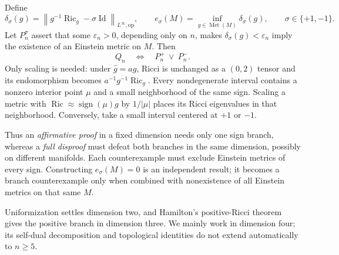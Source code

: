 \documentclass[a4paper,11pt]{article}
\numberwithin{equation}{section}
\theoremstyle{definition}
\newcommand{\Ric}{\operatorname{Ric}}
\newcommand{\Met}{\operatorname{Met}}
\newcommand{\Id}{\operatorname{Id}}
\newcommand{\op}{\mathrm{op}}
\newcommand{\norm}[1]{\left\lVert#1\right\rVert}
\begin{document}
Define
\begin{equation}\label{eq:defect}
 \delta_\sigma(g)=\norm{g^{-1}\Ric_g-\sigma\Id}_{L^\infty,\op},\qquad
 e_\sigma(M)=\inf_{g\in\Met(M)}\delta_\sigma(g),\qquad \sigma\in\{+1,-1\}.
\end{equation}
Let $P_n^\sigma$ assert that some $\varepsilon_n>0$, depending only on $n$, makes $\delta_\sigma(g)<\varepsilon_n$ imply the existence of an Einstein metric on $M$. Then
\begin{equation}\label{eq:branches}
 Q_n\quad\Longleftrightarrow\quad P_n^+\ \lor\ P_n^-.
\end{equation}
Only scaling is needed: under $\widehat g=ag$, Ricci is unchanged as a $(0,2)$ tensor and its endomorphism becomes $a^{-1}g^{-1}\Ric_g$. Every nondegenerate interval contains a nonzero interior point $\mu$ and a small neighborhood of the same sign. Scaling a metric with $\Ric\approx\operatorname{sign}(\mu)g$ by $1/|\mu|$ places its Ricci eigenvalues in that neighborhood. Conversely, take a small interval centered at $+1$ or $-1$.

Thus an \emph{affirmative proof} in a fixed dimension needs only one sign branch, whereas a \emph{full disproof} must defeat both branches in the same dimension, possibly on different manifolds. Each counterexample must exclude Einstein metrics of every sign. Constructing $e_\sigma(M)=0$ is an independent result; it becomes a branch counterexample only when combined with nonexistence of all Einstein metrics on that same $M$.

Uniformization settles dimension two, and Hamilton's positive-Ricci theorem gives the positive branch in dimension three. We mainly work in dimension four; its self-dual decomposition and topological identities do not extend automatically to $n\ge5$.
\end{document}
